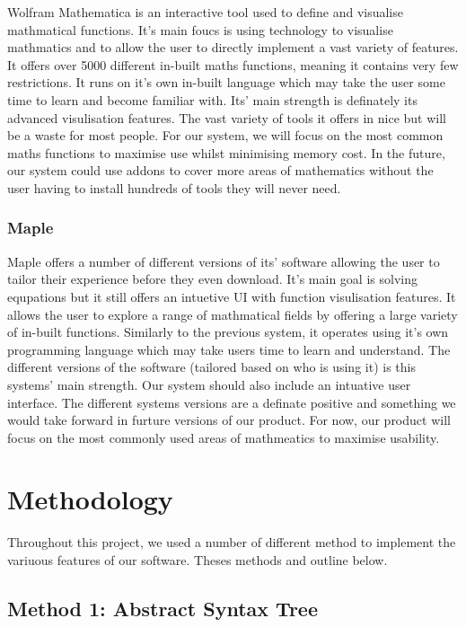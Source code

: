 \documentclass[a4paper, oneside, 11pt]{report}
\begin{document}
Wolfram Mathematica is an interactive tool used to define and visualise mathmatical functions. It's main foucs is using technology to visualise mathmatics and to allow the user to directly implement a vast variety of features. It offers over 5000 different in-built maths functions, meaning it contains very few restrictions. It runs on it's own in-built language which may take the user some time to learn and become familiar with. Its' main strength is definately its advanced visulisation features.
The vast variety of tools it offers in nice but will be a waste for most people. For our system, we will focus on the most common maths functions to maximise use whilst minimising memory cost. In the future, our system could use addons to cover more areas of mathematics without the user having to install hundreds of tools they will never need.


\subsection{Maple\cite{Maple}}

Maple offers a number of different versions of its' software allowing the user to tailor their experience before they even download. It's main goal is solving equpations but it still offers an intuetive UI with function visulisation features. It allows the user to explore a range of mathmatical fields by offering a large variety of in-built functions. Similarly to the previous system, it operates using it's own programming language which may take users time to learn and understand. The different versions of the software (tailored based on who is using it) is this systems' main strength.
Our system should also include an intuative user interface. The different systems versions are a definate positive and something we would take forward in furture versions of our product. For now, our product will focus on the most commonly used areas of mathmeatics to maximise usability.


\chapter{Methodology}

Throughout this project, we used a number of different method to implement the variuous features of our software. Theses methods and outline below.



\section{Method 1: Abstract Syntax Tree}
\end{document}
